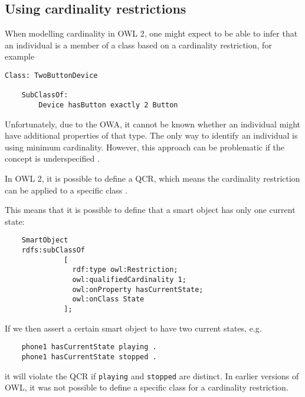 \subsection{Using cardinality restrictions}
\label{CardinalityRestrictions}

When modelling cardinality in \ac{OWL} 2, one might expect to be able to infer that an individual is a member of a class based on a cardinality restriction, for example

\begin{verbatim}
Class: TwoButtonDevice 

	SubClassOf:
		Device hasButton exactly 2 Button
\end{verbatim}

Unfortunately, due to the \ac{OWA}, it cannot be known whether an individual might have additional properties of that type. The only way to identify an individual is using minimum cardinality. However, this approach can be problematic if the concept is underspecified \cite{Hoekstra2008}.



In \ac{OWL} 2, it is possible to define a \ac{QCR}, which means the cardinality restriction can be applied to a specific class \cite{Hebeler2009}. %


 This means that it is possible to define that a smart object has only one current state:

\begin{verbatim}
	SmartObject
	rdfs:subClassOf
	          [
	            rdf:type owl:Restriction;
	            owl:qualifiedCardinality 1;
	            owl:onProperty hasCurrentState;
	            owl:onClass State
	          ];
\end{verbatim}

If we then assert a certain smart object to have two current states, e.g.

\begin{verbatim}
	phone1 hasCurrentState playing .
	phone1 hasCurrentState stopped .
\end{verbatim}

it will violate the \ac{QCR} if \texttt{playing} and \texttt{stopped} are distinct. In earlier versions of \ac{OWL}, it was not possible to define a specific class for a cardinality restriction.






